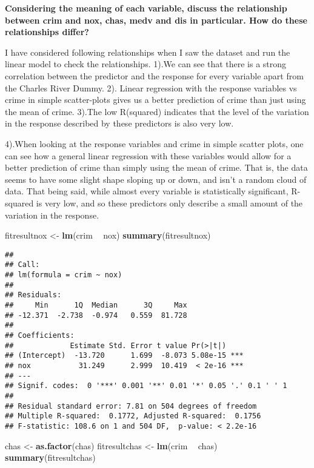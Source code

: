 \documentclass[]{article}
\newenvironment{Shaded}{\begin{snugshade}}{\end{snugshade}}
\newcommand{\KeywordTok}[1]{\textcolor[rgb]{0.13,0.29,0.53}{\textbf{#1}}}
\newcommand{\StringTok}[1]{\textcolor[rgb]{0.31,0.60,0.02}{#1}}
\newcommand{\OperatorTok}[1]{\textcolor[rgb]{0.81,0.36,0.00}{\textbf{#1}}}
\newcommand{\NormalTok}[1]{#1}
\begin{document}
\textbf{Considering the meaning of each variable, discuss the
relationship between crim and nox, chas, medv and dis in particular. How
do these relationships differ?}

I have considered following relationships when I saw the dataset and run
the linear model to check the relationships. 1).We can see that there is
a strong correlation between the predictor and the response for every
variable apart from the Charles River Dummy. 2). Linear regression with
the response variables vs crime in simple scatter-plots gives us a
better prediction of crime than just using the mean of crime. 3).The low
R(squared) indicates that the level of the variation in the response
described by these predictors is also very low.

4).When looking at the response variables and crime in simple scatter
plots, one can see how a general linear regression with these variables
would allow for a better prediction of crime than simply using the mean
of crime. That is, the data seems to have some slight shape sloping up
or down, and isn't a random cloud of data. That being said, while almost
every variable is statistically significant, R-squared is very low, and
so these predictors only describe a small amount of the variation in the
response.

\begin{Shaded}
\begin{Highlighting}[]
\NormalTok{fitresultnox <-}\StringTok{ }\KeywordTok{lm}\NormalTok{(crim }\OperatorTok{~}\StringTok{ }\NormalTok{nox)}
\KeywordTok{summary}\NormalTok{(fitresultnox)}
\end{Highlighting}
\end{Shaded}

\begin{verbatim}
## 
## Call:
## lm(formula = crim ~ nox)
## 
## Residuals:
##     Min      1Q  Median      3Q     Max 
## -12.371  -2.738  -0.974   0.559  81.728 
## 
## Coefficients:
##             Estimate Std. Error t value Pr(>|t|)    
## (Intercept)  -13.720      1.699  -8.073 5.08e-15 ***
## nox           31.249      2.999  10.419  < 2e-16 ***
## ---
## Signif. codes:  0 '***' 0.001 '**' 0.01 '*' 0.05 '.' 0.1 ' ' 1
## 
## Residual standard error: 7.81 on 504 degrees of freedom
## Multiple R-squared:  0.1772, Adjusted R-squared:  0.1756 
## F-statistic: 108.6 on 1 and 504 DF,  p-value: < 2.2e-16
\end{verbatim}

\begin{Shaded}
\begin{Highlighting}[]
\NormalTok{chas <-}\StringTok{ }\KeywordTok{as.factor}\NormalTok{(chas)}
\NormalTok{fitresultchas <-}\StringTok{ }\KeywordTok{lm}\NormalTok{(crim }\OperatorTok{~}\StringTok{ }\NormalTok{chas)}
\KeywordTok{summary}\NormalTok{(fitresultchas)}
\end{Highlighting}
\end{Shaded}
\end{document}

